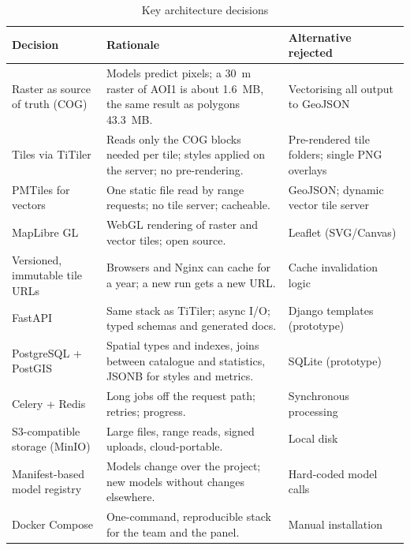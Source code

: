 \documentclass[11pt,a4paper]{article}
\begin{document}
\begin{table}[H]
\centering\small
\caption{Key architecture decisions}
\label{tab:adr}
\begin{tabularx}{\textwidth}{L{3.6cm} Y L{3.6cm}}
\toprule
\textbf{Decision} & \textbf{Rationale} & \textbf{Alternative rejected}\\
\midrule
Raster as source of truth (COG) & Models predict pixels; a 30~m raster of AOI1 is about 1.6~MB, the same result as polygons 43.3~MB. & Vectorising all output to GeoJSON\\
Tiles via TiTiler & Reads only the COG blocks needed per tile; styles applied on the server; no pre-rendering. & Pre-rendered tile folders; single PNG overlays\\
PMTiles for vectors & One static file read by range requests; no tile server; cacheable. & GeoJSON; dynamic vector tile server\\
MapLibre GL & WebGL rendering of raster and vector tiles; open source. & Leaflet (SVG/Canvas)\\
Versioned, immutable tile URLs & Browsers and Nginx can cache for a year; a new run gets a new URL. & Cache invalidation logic\\
FastAPI & Same stack as TiTiler; async I/O; typed schemas and generated docs. & Django templates (prototype)\\
PostgreSQL + PostGIS & Spatial types and indexes, joins between catalogue and statistics, JSONB for styles and metrics. & SQLite (prototype)\\
Celery + Redis & Long jobs off the request path; retries; progress. & Synchronous processing\\
S3-compatible storage (MinIO) & Large files, range reads, signed uploads, cloud-portable. & Local disk\\
Manifest-based model registry & Models change over the project; new models without changes elsewhere. & Hard-coded model calls\\
Docker Compose & One-command, reproducible stack for the team and the panel. & Manual installation\\
\bottomrule
\end{tabularx}
\end{table}
\end{document}
